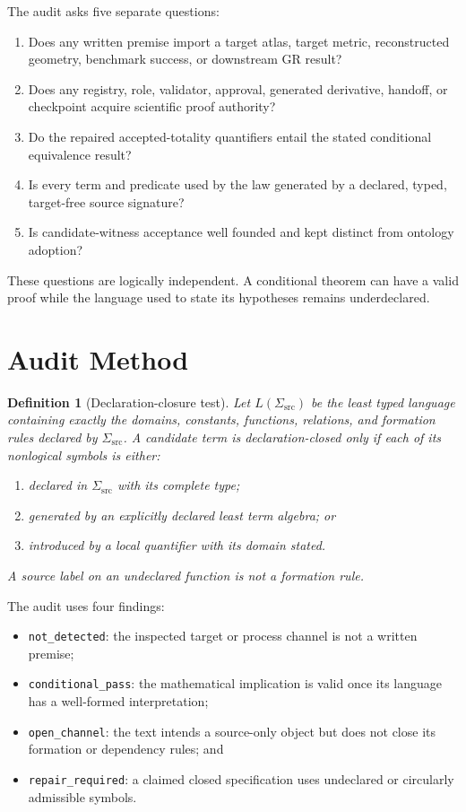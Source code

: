 \documentclass[11pt]{article}
\newtheorem{definition}{Definition}
\begin{document}
The audit asks five separate questions:
\begin{enumerate}[leftmargin=*]
  \item Does any written premise import a target atlas, target metric,
  reconstructed geometry, benchmark success, or downstream GR result?
  \item Does any registry, role, validator, approval, generated derivative,
  handoff, or checkpoint acquire scientific proof authority?
  \item Do the repaired accepted-totality quantifiers entail the stated
  conditional equivalence result?
  \item Is every term and predicate used by the law generated by a declared,
  typed, target-free source signature?
  \item Is candidate-witness acceptance well founded and kept distinct from
  ontology adoption?
\end{enumerate}
These questions are logically independent. A conditional theorem can have a
valid proof while the language used to state its hypotheses remains
underdeclared.

\section{Audit Method}

\begin{definition}[Declaration-closure test]
Let \(L(\Sigma_{\mathrm{src}})\) be the least typed language containing exactly
the domains, constants, functions, relations, and formation rules declared by
\(\Sigma_{\mathrm{src}}\). A candidate term is declaration-closed only if each
of its nonlogical symbols is either:
\begin{enumerate}[leftmargin=*]
  \item declared in \(\Sigma_{\mathrm{src}}\) with its complete type;
  \item generated by an explicitly declared least term algebra; or
  \item introduced by a local quantifier with its domain stated.
\end{enumerate}
A source label on an undeclared function is not a formation rule.
\end{definition}

The audit uses four findings:
\begin{itemize}[leftmargin=*]
  \item \texttt{not\_detected}: the inspected target or process channel is not
  a written premise;
  \item \texttt{conditional\_pass}: the mathematical implication is valid
  once its language has a well-formed interpretation;
  \item \texttt{open\_channel}: the text intends a source-only object but does
  not close its formation or dependency rules; and
  \item \texttt{repair\_required}: a claimed closed specification uses
  undeclared or circularly admissible symbols.
\end{itemize}
\end{document}
